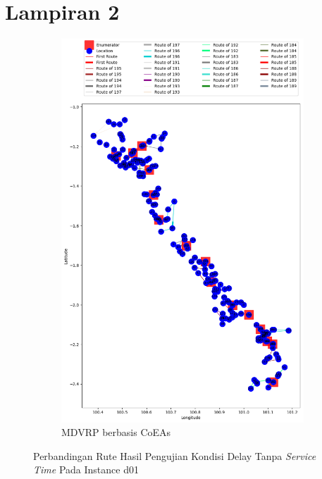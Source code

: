 \chapter*{Lampiran 2}
\label{ch:test_result_delay}


\begin{figure}[H]
	\centering
	\begin{subfigure}[t]{0.9\textwidth}
		\centering
		\includegraphics[width=\textwidth]{Resources/Images/delayed_1/real_m15_n100_delayed_1_coes}
		\caption{MDVRP berbasis CoEAs}
		\label{fig:real_m15_n100_delayed_1_coes}
	\end{subfigure}
	\caption{Perbandingan Rute Hasil Pengujian Kondisi Delay Tanpa \textit{Service Time} Pada Instance d01}
	\label{fig:real_m15_n100_delayed_1}
\end{figure}


